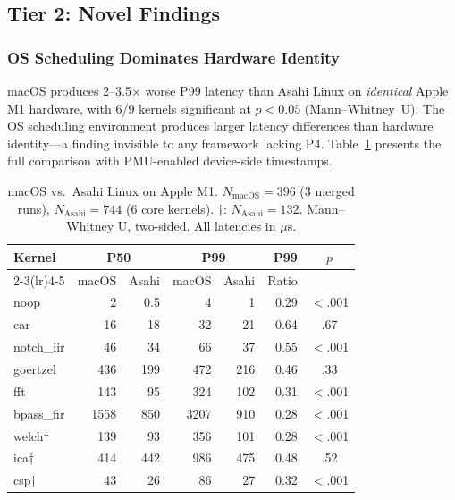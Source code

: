 \documentclass[sigplan,10pt]{acmart}
\begin{document}
\subsection{Tier 2: Novel Findings}

\subsubsection{OS Scheduling Dominates Hardware Identity}
\label{sec:os-dominates}

macOS produces 2--3.5$\times$ worse P99 latency than Asahi Linux on \emph{identical} Apple M1 hardware, with 6/9 kernels significant at $p < 0.05$ (Mann--Whitney~U). The OS scheduling environment produces larger latency differences than hardware identity---a finding invisible to any framework lacking P4. Table~\ref{tab:crossplat} presents the full comparison with PMU-enabled device-side timestamps.

\begin{table}[t]
\centering
\caption{macOS vs.\ Asahi Linux on Apple M1. $N_{\text{macOS}}=396$ (3 merged runs), $N_{\text{Asahi}}=744$ (6 core kernels). $\dagger$: $N_{\text{Asahi}}=132$. Mann--Whitney U, two-sided. All latencies in $\mu$s.}
\label{tab:crossplat}
\small
\begin{tabular}{@{}lrrrrrc@{}}
\toprule
Kernel & \multicolumn{2}{c}{P50} & \multicolumn{2}{c}{P99} & P99 & $p$ \\
\cmidrule(lr){2-3}\cmidrule(lr){4-5}
 & macOS & Asahi & macOS & Asahi & Ratio & \\
\midrule
noop & 2 & 0.5 & 4 & 1 & 0.29 & $<$.001 \\
car & 16 & 18 & 32 & 21 & 0.64 & .67 \\
notch\_iir & 46 & 34 & 66 & 37 & 0.55 & $<$.001 \\
goertzel & 436 & 199 & 472 & 216 & 0.46 & .33 \\
fft & 143 & 95 & 324 & 102 & 0.31 & $<$.001 \\
bpass\_fir & 1558 & 850 & 3207 & 910 & 0.28 & $<$.001 \\
welch$\dagger$ & 139 & 93 & 356 & 101 & 0.28 & $<$.001 \\
ica$\dagger$ & 414 & 442 & 986 & 475 & 0.48 & .52 \\
csp$\dagger$ & 43 & 26 & 86 & 27 & 0.32 & $<$.001 \\
\bottomrule
\end{tabular}
\end{table}

\end{document}
